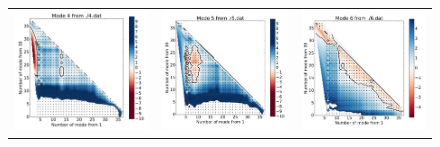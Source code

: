 \begin{figure}[H]
\begin{center}
\begin{tabular}{c c c}
				\includegraphics{image/image/P1-F321} & \includegraphics{image/image/P1-F322} & \includegraphics{image/image/P1-F323} \\

\end{tabular}
\end{center}
\end{figure}
